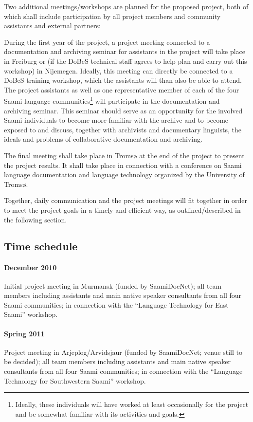 \documentclass[a4paper,12pt]{article}
\begin{document}
{{{{Two additional meetings/workshops are planned for the proposed project, both of which shall include participation by all project members and community assistants and external partners:%

During the first year of the project, a project meeting connected to a documentation and archiving seminar for assistants in the project will take place in Freiburg or (if the DoBeS technical staff agrees to help plan and carry out this workshop) in Nijemegen. Ideally, this meeting can directly be connected to a DoBeS training workshop, which the assistants will than also be able to attend. The project assistants as well as one representative member of each of the four Saami language communities\footnote{Ideally, these individuals will have worked at least occasionally for the project and be somewhat familiar with its activities and goals.} will participate in the documentation and archiving seminar. This seminar should serve as an opportunity for the involved Saami individuals to become more familiar with the archive and to become exposed to and discuss, together with archivists and documentary linguists, the ideals and problems of collaborative documentation and archiving.%

The final meeting shall take place in Tromsø at the end of the project to present the project results. It shall take place in connection with a conference on Saami language documentation and language technology organized by the University of Tromsø.

Together, daily communication and the project meetings will fit together in order to meet the project goals in a timely and efficient way, as outlined/described in the following section.

\subsection{Time schedule}

\paragraph{December 2010}Initial project meeting in Murmansk (funded by SaamiDocNet); all team members including assistants and main native speaker consultants from all four Saami communities; in connection with the “Language Technology for East Saami” workshop.

\paragraph{Spring 2011}Project meeting in Arjeplog/Arvidsjaur (funded by SaamiDocNet; venue still to be decided); all team members including assistants and main native speaker consultants from all four Saami communities; in connection with the “Language Technology for Southwestern Saami” workshop.

}}}}
\end{document}
